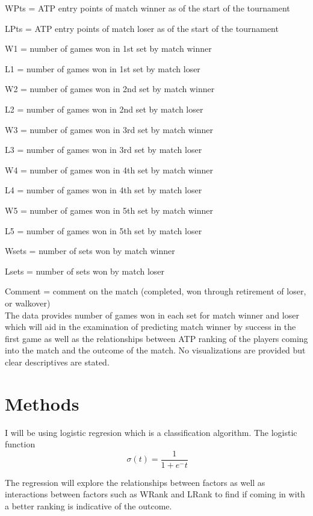 \documentclass[12pt]{article}
\begin{document}
WPts = ATP entry points of match winner as of the start of the tournament

LPts = ATP entry points of match loser as of the start of the tournament

W1 = number of games won in 1st set by match winner

L1 = number of games won in 1st set by match loser

W2 = number of games won in 2nd set by match winner

L2 = number of games won in 2nd set by match loser

W3 = number of games won in 3rd set by match winner

L3 = number of games won in 3rd set by match loser

W4 = number of games won in 4th set by match winner

L4 = number of games won in 4th set by match loser

W5 = number of games won in 5th set by match winner

L5 = number of games won in 5th set by match loser

Wsets = number of sets won by match winner

Lsets = number of sets won by match loser

Comment = comment on the match (completed, won through retirement of loser, or walkover)\\

The data provides number of games won in each set for match winner and loser which will 
aid in the examination of predicting match winner by success in the first game as well 
as the relationships between ATP ranking of the players coming into the match and the outcome 
of the match. No visualizations are provided but clear descriptives are stated.


\section{Methods}
\label{sec:meth}


I will be using logistic regresion which is a classification algorithm. The logistic 
function 
\begin{equation}
  \label{eq:logreg}
    \ \sigma(t) = \frac{1}{1 + e^-t}
\end{equation}
  
The regression will explore the relationships between factors as well as interactions 
between factors such as WRank and LRank to find if coming in with a better ranking is 
indicative of the outcome.
\end{document}
